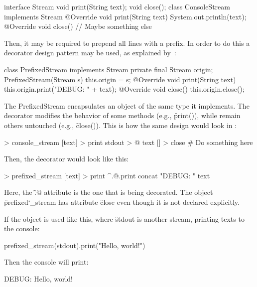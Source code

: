\begin{eocode}
interface Stream {
  void print(String text);
  void close();
}
class ConsoleStream implements Stream {
  @Override
  void print(String text) {
    System.out.println(text);
  }
  @Override
  void close() {
    // Maybe something else
  }
}
\end{eocode}

Then, it may be required to prepend all lines with a prefix. In order
to do this a decorator design pattern may be used,
as explained by~\citet[p.196]{gamma1994design}:

\begin{eocode}
class PrefixedStream implements Stream {
  private final Stream origin;
  PrefixedStream(Stream s) {
    this.origin = s;
  }
  @Override
  void print(String text) {
    this.origin.print("DEBUG: " + text);
  }
  @Override
  void close() {
    this.origin.close();
  }
}
\end{eocode}

The \f{PrefixedStream} encapsulates an object of the same type it
implements. The decorator modifies the behavior of some methods (e.g., \f{print()}), while
remain others untouched (e.g., \f{close()}). This is how the same design
would look in \eo{}:

\begin{eocode}
[] > console_stream
  [text] > print
    stdout > @
      text
  [] > close
    # Do something here
\end{eocode}

Then, the decorator would look like this:

\begin{eocode}
[@] > prefixed_stream
  [text] > print
    ^.@.print
      concat
        "DEBUG: "
        text
\end{eocode}

Here, the \f{\^.@} attribute is the one that is being decorated.
The object \f{prefixed\char`_stream} has attribute \f{close} even
though it is not declared explicitly.

If the object is used like this, where \f{stdout} is another stream,
printing texts to the console:

\begin{eocode}
prefixed_stream(stdout).print("Hello, world!")
\end{eocode}

Then the console will print:

\begin{eocode}
DEBUG: Hello, world!
\end{eocode}

